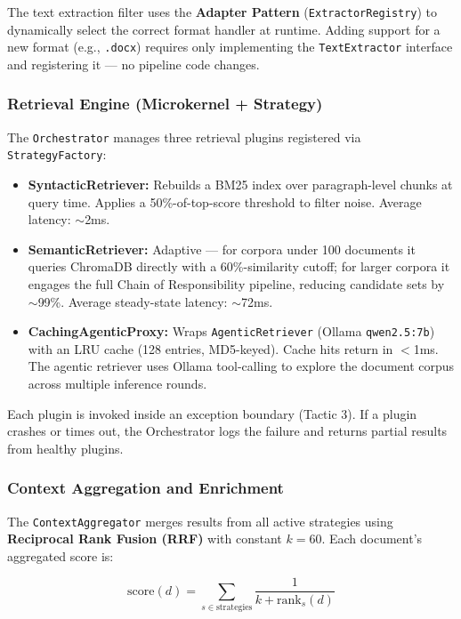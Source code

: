 \documentclass[11pt,a4paper]{article}
\begin{document}
The text extraction filter uses the \textbf{Adapter Pattern} (\texttt{ExtractorRegistry}) to dynamically select the correct format handler at runtime. Adding support for a new format (e.g., \texttt{.docx}) requires only implementing the \texttt{TextExtractor} interface and registering it --- no pipeline code changes.

\subsubsection{Retrieval Engine (Microkernel + Strategy)}

The \texttt{Orchestrator} manages three retrieval plugins registered via \texttt{StrategyFactory}:

\begin{itemize}
    \item \textbf{SyntacticRetriever:} Rebuilds a BM25 index over paragraph-level chunks at query time. Applies a 50\%-of-top-score threshold to filter noise. Average latency: $\sim$2ms.
    \item \textbf{SemanticRetriever:} Adaptive --- for corpora under 100 documents it queries ChromaDB directly with a 60\%-similarity cutoff; for larger corpora it engages the full Chain of Responsibility pipeline, reducing candidate sets by $\sim$99\%. Average steady-state latency: $\sim$72ms.
    \item \textbf{CachingAgenticProxy:} Wraps \texttt{AgenticRetriever} (Ollama \texttt{qwen2.5:7b}) with an LRU cache (128 entries, MD5-keyed). Cache hits return in $<$1ms. The agentic retriever uses Ollama tool-calling to explore the document corpus across multiple inference rounds.
\end{itemize}

Each plugin is invoked inside an exception boundary (Tactic 3). If a plugin crashes or times out, the Orchestrator logs the failure and returns partial results from healthy plugins.

\subsubsection{Context Aggregation and Enrichment}

The \texttt{ContextAggregator} merges results from all active strategies using \textbf{Reciprocal Rank Fusion (RRF)} with constant $k=60$. Each document's aggregated score is:

\[
\text{score}(d) = \sum_{s \in \text{strategies}} \frac{1}{k + \text{rank}_s(d)}
\]
\end{document}
